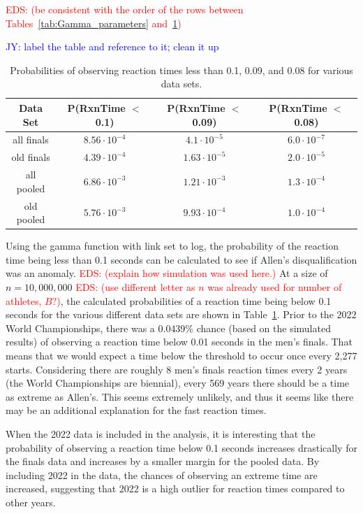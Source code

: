 \documentclass[12pt, letterpaper, titlepage]{article}
\newcommand{\jy}[1]{\textcolor{blue}{JY: #1}}
\newcommand{\eds}[1]{\textcolor{red}{EDS: (#1)}}
\begin{document}
\eds{be consistent with the order of the rows between 
Tables~\ref{tab:Gamma_parameters} and~\ref{tab:Sim_probability}}

\jy{label the table and reference to it; clean it up}
\begin{table}
  \centering
  \caption{Probabilities of observing reaction times less than 0.1, 0.09, and
  0.08 for various data sets.}
  \begin{tabular}{c c c c} 
   \toprule
   Data Set & P(RxnTime $<$ 0.1) & P(RxnTime $<$ 0.09) & P(RxnTime $<$ 0.08) \\ 
   \midrule
   all finals & $8.56\cdot10^{-4}$ & $4.1\cdot10^{-5}$ & $6.0\cdot10^{-7}$ \\ 
   old finals & $4.39\cdot10^{-4}$ & $1.63\cdot10^{-5}$ & $2.0\cdot10^{-5}$ \\
   all pooled & $6.86\cdot10^{-3}$ & $1.21\cdot10^{-3}$ & $1.3\cdot10^{-4}$ \\
   old pooled & $5.76\cdot10^{-3}$ & $9.93\cdot10^{-4}$ & $1.0\cdot10^{-4}$\\
   \bottomrule
  \end{tabular}
  \label{tab:Sim_probability}
\end{table}

Using the gamma function with link set to log, the probability of the reaction 
time being less than 0.1 seconds can be calculated to see if Allen's 
disqualification was an anomaly. \eds{explain how simulation was used here.}
At a size of $n=10,000,000$ \eds{use different letter as $n$ was already used 
for number of athletes, $B?$}, the calculated probabilities of a reaction time 
being below 0.1 seconds for the various different data sets are shown in 
Table~\ref{tab:Sim_probability}. Prior to the 2022 World Championships, there was 
a 0.0439\% chance (based on the
simulated results) of observing a reaction time below 0.01 seconds in the men's
finals.
That means that we would expect a time below the threshold to occur
once every 2,277 starts.  Considering there are roughly 8 men's finals reaction
times every 2 years (the World Championships are biennial), every 569 years there
should be a time as extreme as Allen's. This seems extremely unlikely, and thus
it seems like there may be an additional explanation for the fast reaction times.


When the 2022 data is included in the analysis, it is interesting that the 
probability of observing a reaction time below 0.1 seconds increases drastically 
for the finals data and increases by a smaller margin for the pooled data.  By
including 2022 in the data, the chances of observing an extreme time are 
increased, suggesting that 2022 is a high outlier for reaction times compared to
 other years.
\end{document}
